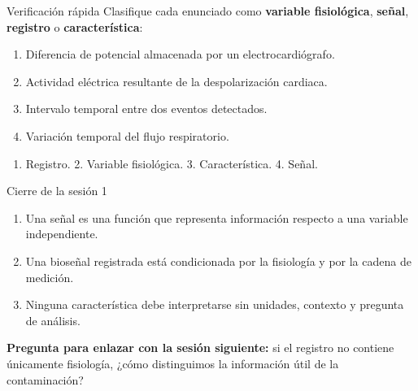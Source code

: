 \documentclass[
  ignorenonframetext,
  aspectratio=169,
  spanish,
  professionalfonts]{beamer}
\providecommand{\tightlist}{%
  \setlength{\itemsep}{0pt}\setlength{\parskip}{0pt}}
\begin{document}
\begin{frame}{Verificación rápida}
\protect{}\label{verificaciuxf3n-ruxe1pida}
Clasifique cada enunciado como \textbf{variable fisiológica},
\textbf{señal}, \textbf{registro} o \textbf{característica}:

\begin{enumerate}
\tightlist
\item
  Diferencia de potencial almacenada por un electrocardiógrafo.
\item
  Actividad eléctrica resultante de la despolarización cardiaca.
\item
  Intervalo temporal entre dos eventos detectados.
\item
  Variación temporal del flujo respiratorio.
\end{enumerate}

\begin{tcolorbox}[enhanced jigsaw, arc=.35mm, bottomrule=.15mm, bottomtitle=1mm, breakable, colback=white, colbacktitle=quarto-callout-note-color!10!white, colframe=quarto-callout-note-color-frame, coltitle=black, left=2mm, leftrule=.75mm, opacityback=0, opacitybacktitle=0.6, rightrule=.15mm, title={Criterio de respuesta}, titlerule=0mm, toprule=.15mm, toptitle=1mm]

\begin{enumerate}
\tightlist
\item
  Registro. 2. Variable fisiológica. 3. Característica. 4. Señal.
\end{enumerate}

\end{tcolorbox}
\end{frame}

\begin{frame}{Cierre de la sesión 1}
\protect{}\label{cierre-de-la-sesiuxf3n-1}
\begin{tcolorbox}[enhanced jigsaw, arc=.35mm, bottomrule=.15mm, bottomtitle=1mm, breakable, colback=white, colbacktitle=quarto-callout-important-color!10!white, colframe=quarto-callout-important-color-frame, coltitle=black, left=2mm, leftrule=.75mm, opacityback=0, opacitybacktitle=0.6, rightrule=.15mm, title={Tres ideas que deben permanecer}, titlerule=0mm, toprule=.15mm, toptitle=1mm]

\begin{enumerate}
\tightlist
\item
  Una señal es una función que representa información respecto a una
  variable independiente.\\
\item
  Una bioseñal registrada está condicionada por la fisiología y por la
  cadena de medición.\\
\item
  Ninguna característica debe interpretarse sin unidades, contexto y
  pregunta de análisis.
\end{enumerate}

\end{tcolorbox}

\textbf{Pregunta para enlazar con la sesión siguiente:} si el registro
no contiene únicamente fisiología, ¿cómo distinguimos la información
útil de la contaminación?
\end{frame}
\end{document}
